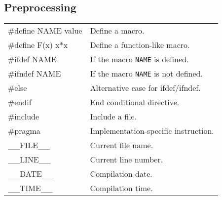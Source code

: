 \documentclass[5pt]{article}
\begin{document}
\begin{multicols}{2}
\subsection{Preprocessing}
\begin{tabular}{>{\ttfamily}l l}
\#define NAME value    & Define a macro.\\
\#define F(x) x*x      & Define a function-like macro.\\
\#ifdef NAME          & If the macro \texttt{NAME} is defined.\\
\#ifndef NAME         & If the macro \texttt{NAME} is not defined.\\
\#else               & Alternative case for ifdef/ifndef.\\
\#endif              & End conditional directive.\\
\#include            & Include a file.\\
\#pragma             & Implementation-specific instruction.\\
\_\_FILE\_\_         & Current file name.\\
\_\_LINE\_\_         & Current line number.\\
\_\_DATE\_\_         & Compilation date.\\
\_\_TIME\_\_         & Compilation time.\\
\end{tabular}

\end{multicols}
\end{document}
